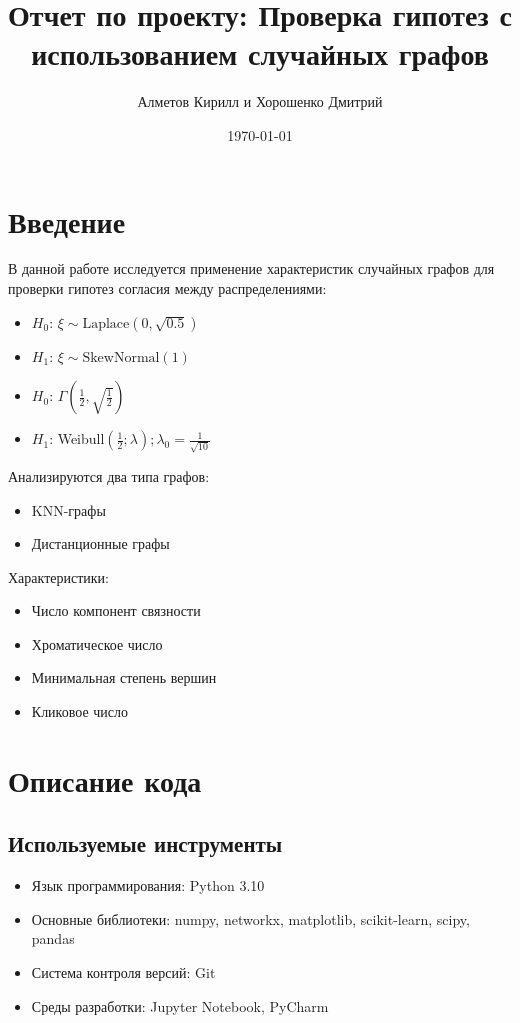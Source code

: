 \documentclass[a4paper, 12pt]{article}
\title{Отчет по проекту: Проверка гипотез с использованием случайных графов}
\author{Алметов Кирилл и Хорошенко Дмитрий}
\date{\today}
\begin{document}
\maketitle
\tableofcontents

\section{Введение}
В данной работе исследуется применение характеристик случайных графов для проверки гипотез согласия между распределениями:
\begin{itemize}
    \item $H_0$: $\xi \sim \text{Laplace}(0, \sqrt{0.5})$
    \item $H_1$: $\xi \sim \text{SkewNormal}(1)$
    \item $H_0$: $ \Gamma (\frac{1}{2}, \sqrt{\frac{1}{2}})$
    \item $H_1$: Weibull$(\frac{1}{2}; \lambda); \lambda_0 = \frac{1}{\sqrt{10}}$
\end{itemize}

Анализируются два типа графов:

\begin{itemize}
    \item KNN-графы
    \item Дистанционные графы
\end{itemize}

Характеристики:

\begin{itemize}
    \item Число компонент связности
    \item Хроматическое число
    \item Минимальная степень вершин
    \item Кликовое число
\end{itemize}

\section{Описание кода}
\subsection{Используемые инструменты}
\begin{itemize}
    \item Язык программирования: Python 3.10
    \item Основные библиотеки: numpy, networkx, matplotlib, scikit-learn, scipy, pandas
    \item Система контроля версий: Git
    \item Среды разработки: Jupyter Notebook, PyCharm
\end{itemize}
\end{document}
